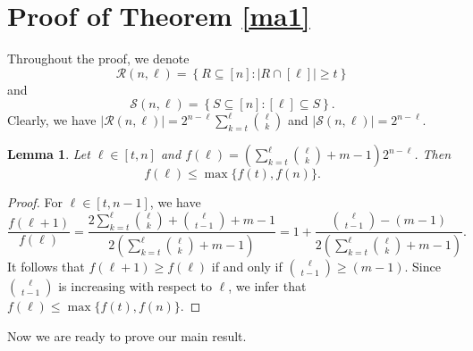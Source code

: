 \documentclass[11pt,a4paper]{article}
\newtheorem{lemma}[theorem]{Lemma}
\begin{document}
\section{Proof of Theorem \ref{ma1}} \label{se3} 



Throughout the proof, we denote 
$$ \mathcal{R}(n, \ell)  =\left\{R \subseteq [n]:|R \cap[\ell]| \geq  t\right\} $$ 
and 
$$ \mathcal{S}(n,\ell)  =\left\{S \subseteq [n]: [\ell] \subseteq S\right\}.$$
Clearly, we have $|\mathcal{R}(n, \ell)|=2^{n-\ell}\sum_{k=t}^{\ell}\binom{\ell}{k}$ and $|\mathcal{S}(n,\ell)|=2^{n-\ell}$.



\begin{lemma}\label{le4}
Let $\ell\in [t,n]$  and $f(\ell)= \left(\sum_{k=t}^{\ell}\binom{\ell}{k}  + m - 1\right)2^{n-\ell}$. Then 
$$f(\ell)\leq\max\{f(t), f(n)\}.$$
\end{lemma}

\begin{proof}
For $\ell\in [t,n-1]$, we have 
$$
\frac{f(\ell+1)}{f(\ell)}= \frac{2\sum_{k=t}^{\ell}\binom{\ell}{k}  +\binom{\ell}{t-1}+ m - 1}{2\left(\sum_{k=t}^{\ell}\binom{\ell}{k}  + m - 1\right)}=1+\frac{\binom{\ell}{t-1}-( m - 1)}{2\left(\sum_{k=t}^{\ell}\binom{\ell}{k}  + m - 1\right)}.
$$
It follows that $f(\ell+1)\geq  f(\ell)$ if and only if $\binom{\ell}{t-1}\geq ( m - 1)$. Since $\binom{\ell}{t-1}$ is increasing with respect to $\ell$, we infer that $f(\ell)\leq\max\{f(t), f(n)\}.$
\end{proof}

Now we are ready to prove our main result.
\end{document}
